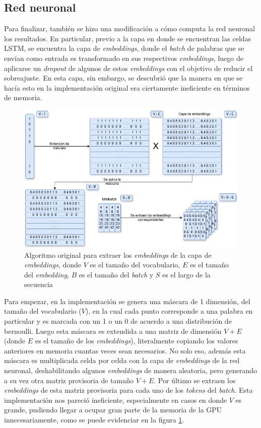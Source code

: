 \subsection{Red neuronal}

Para finalizar, también se hizo una modificación a cómo computa la red neuronal los resultados. En particular, previo a la capa en donde se encuentran las celdas LSTM, se encuentra la capa de \textit{embeddings}, donde el \textit{batch} de palabras que se envían como entrada es transformado en sus respectivos \textit{embeddings}, luego de aplicarse un \textit{dropout} de algunos de estos \textit{embeddings} con el objetivo de reducir el sobreajuste. En esta capa, sin embargo, se descubrió que la manera en que se hacía esto en la implementación original era ciertamente ineficiente en términos de memoria.

\begin{figure}[H]
    \centering
    \includegraphics[width=1\textwidth]{imagenes/algoritmo_viejo.png}
    \caption{Algoritmo original para extraer los \textit{embeddings} de la capa de \textit{embeddings}, donde $V$ es el tamaño del vocabulario, $E$ es el tamaño del \textit{embedding}, $B$ es el tamaño del \textit{batch} y $S$ es el largo de la secuencia}
    \label{fig:algoritmo_viejo}
\end{figure}

Para empezar, en la implementación se genera una máscara de 1 dimensión, del tamaño del vocabulario ($V$), en la cual cada punto corresponde a una palabra en particular y es marcada con un 1 o un 0 de acuerdo a una distribución de bernoulli. Luego esta máscara es extendida a una matriz de dimensión $V + E$ (donde $E$ es el tamaño de los \textit{embeddings}), literalmente copiando los valores anteriores en memoria cuantas veces sean necesarios. No solo eso, además esta máscara es multiplicada celda por celda con la capa de \textit{embeddings} de la red neuronal, deshabilitando algunos \textit{embeddings} de manera aleatoria, pero generando a su vez otra matriz provisoria de tamaño $V + E$. Por último se extraen los \textit{embeddings} de esta matriz provisoria para cada uno de los \textit{tokens} del \textit{batch}. Esta implementación nos pareció ineficiente, especialmente en casos en donde $V$ es grande, pudiendo llegar a ocupar gran parte de la memoria de la GPU innecesariamente, como se puede evidenciar en la figura \ref{fig:algoritmo_viejo}.

